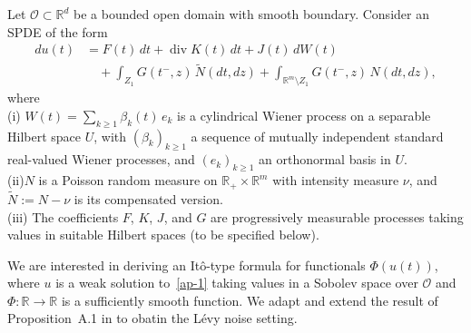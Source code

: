 \documentclass[11pt]{article}
\theoremstyle{plain}
\numberwithin{equation}{section}
\begin{document}
Let $\mathcal{O} \subset \mathbb{R}^d$ be a bounded open domain with smooth boundary. Consider an SPDE of the form
\begin{align}\label{ap-1}
du(t) &= F(t)\,dt + \operatorname{div}K(t)\,dt + J(t)\,dW(t) \nonumber\\
&\quad + \int_{Z_1} G(t^-,z)\,\tilde{N}(dt,dz) + \int_{\mathbb{R}^m\setminus Z_1} G(t^-,z)\,N(dt,dz),
\end{align}
where\\
(i) $W(t) = \sum_{k\ge1} \beta_k(t)\,e_k$ is a cylindrical Wiener process on a separable Hilbert space $U$, with $(\beta_k)_{k\ge1}$ a sequence of mutually independent standard real-valued Wiener processes, and $(e_k)_{k\ge1}$ an orthonormal basis in $U$.\\
(ii)$N$ is a Poisson random measure on $\mathbb{R}_+\times\mathbb{R}^m$ with intensity measure $\nu$, and $\tilde{N} := N - \nu$ is its compensated version.\\
(iii) The coefficients $F$, $K$, $J$, and $G$ are progressively measurable processes taking values in suitable Hilbert spaces (to be specified below).
 

We are interested in deriving an It\^o-type formula for functionals $\Phi(u(t))$, where $u$ is a weak solution to~\eqref{ap-1} taking values in a Sobolev space over $\mathcal{O}$ and $\Phi:\mathbb{R}\to\mathbb{R}$ is a sufficiently smooth function.
We adapt and extend the result of Proposition~A.1 in \cite{AMJ} to obatin the Lévy noise setting.  
\end{document}
